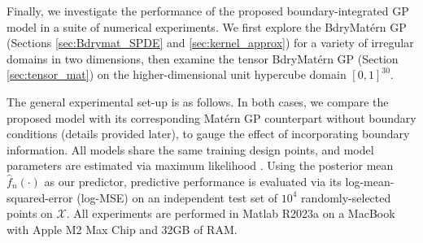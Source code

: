 \documentclass[aos,preprint]{imsart}
\theoremstyle{plain}
\newcommand{\BX}{\bold X}
\newcommand{\Bx}{\bold x}
\theoremstyle{remark}
\begin{document}
Finally, we investigate the performance of the proposed boundary-integrated GP model in a suite of numerical experiments. We first explore the BdryMat\'ern GP (Sections \ref{sec:Bdrymat_SPDE} and \ref{sec:kernel_approx}) for a variety of irregular domains in two dimensions, then examine the tensor BdryMat\'ern GP (Section \ref{sec:tensor_mat}) on the higher-dimensional unit hypercube domain $[0,1]^{30}$. 

The general experimental set-up is as follows. In both cases, we compare the proposed model with its corresponding Mat\'ern GP counterpart without boundary conditions (details provided later), to gauge the effect of incorporating boundary information. All models share the same training design points, and model parameters are estimated via maximum likelihood \citep{casella2002}. Using the posterior mean $\hat{f}_n(\cdot)$ as our predictor, predictive performance is evaluated via its log-mean-squared-error (log-MSE) on an independent test set of $10^4$ randomly-selected points on $\mathcal{X}$. All experiments are performed in Matlab R2023a on a MacBook with Apple M2 Max Chip and 32GB of RAM.


\end{document}
